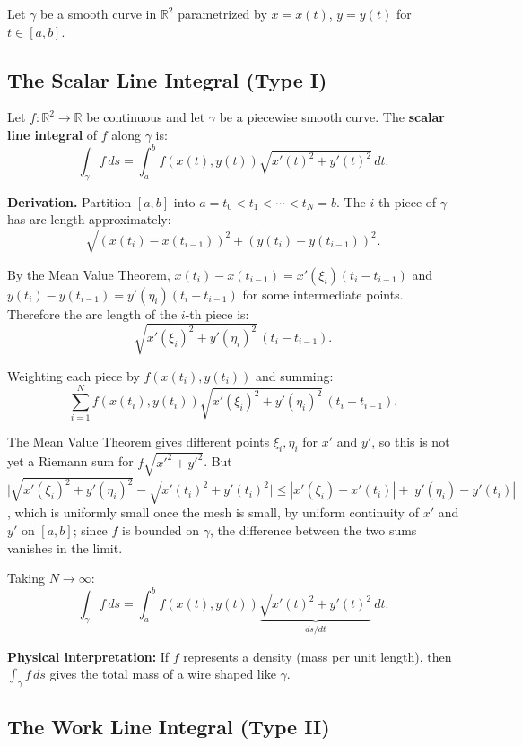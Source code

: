 \documentclass[11pt]{report}
\newcommand{\R}{\mathbb{R}}
\begin{document}
Let $\gamma$ be a smooth curve in $\R^2$ parametrized by $x = x(t)$, $y = y(t)$ for $t \in [a, b]$.

\subsection{The Scalar Line Integral (Type I)}

\begin{definition}
Let $f: \R^2 \to \R$ be continuous and let $\gamma$ be a piecewise smooth curve. The \textbf{scalar line integral} of $f$ along $\gamma$ is:
\[
\int_\gamma f \, ds = \int_a^b f(x(t), y(t)) \sqrt{x'(t)^2 + y'(t)^2} \, dt.
\]
\end{definition}

\textbf{Derivation.} Partition $[a, b]$ into $a = t_0 < t_1 < \cdots < t_N = b$. The $i$-th piece of $\gamma$ has arc length approximately:
\[
\sqrt{(x(t_i) - x(t_{i-1}))^2 + (y(t_i) - y(t_{i-1}))^2}.
\]

By the Mean Value Theorem, $x(t_i) - x(t_{i-1}) = x'(\xi_i)(t_i - t_{i-1})$ and $y(t_i) - y(t_{i-1}) = y'(\eta_i)(t_i - t_{i-1})$ for some intermediate points. Therefore the arc length of the $i$-th piece is:
\[
\sqrt{x'(\xi_i)^2 + y'(\eta_i)^2} \, (t_i - t_{i-1}).
\]

Weighting each piece by $f(x(t_i), y(t_i))$ and summing:
\[
\sum_{i=1}^N f(x(t_i), y(t_i)) \sqrt{x'(\xi_i)^2 + y'(\eta_i)^2} \, (t_i - t_{i-1}).
\]

The Mean Value Theorem gives different points $\xi_i, \eta_i$ for $x'$ and $y'$, so this is not yet a Riemann sum for $f \sqrt{x'^2 + y'^2}$. But $\big|\sqrt{x'(\xi_i)^2 + y'(\eta_i)^2} - \sqrt{x'(t_i)^2 + y'(t_i)^2}\big| \leq |x'(\xi_i) - x'(t_i)| + |y'(\eta_i) - y'(t_i)|$, which is uniformly small once the mesh is small, by uniform continuity of $x'$ and $y'$ on $[a, b]$; since $f$ is bounded on $\gamma$, the difference between the two sums vanishes in the limit.

Taking $N \to \infty$:
\[
\int_\gamma f \, ds = \int_a^b f(x(t), y(t)) \underbrace{\sqrt{x'(t)^2 + y'(t)^2}}_{ds/dt} \, dt.
\]

\textbf{Physical interpretation:} If $f$ represents a density (mass per unit length), then $\int_\gamma f \, ds$ gives the total mass of a wire shaped like $\gamma$.

\subsection{The Work Line Integral (Type II)}
\end{document}
